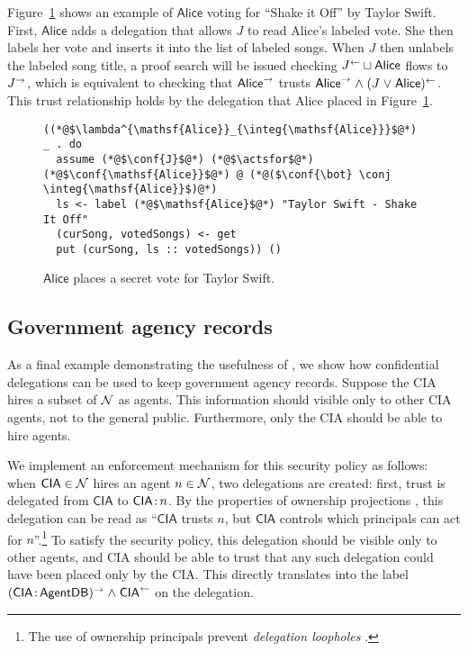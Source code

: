 Figure~\ref{fig:jukebox-alice-votes-for-taylor-swift} shows an example of $\mathsf{Alice}$ voting for ``Shake it Off'' by Taylor Swift. First, $\mathsf{Alice}$ adds a delegation that allows $J$ to read Alice's labeled vote. She then labels her vote and inserts it into the list of labeled songs. When $J$ then unlabels the labeled song title, a proof search will be issued checking $J^{\leftarrow} \sqcup \mathsf{Alice}$ flows to $J^{\rightarrow}$, which is equivalent to checking that $\mathsf{Alice}^{\rightarrow}$ trusts $\mathsf{Alice}^{\rightarrow} \mathrel{\land} (J \mathrel{\lor} \mathsf{Alice})^{\leftarrow}$. This trust relationship holds by the delegation that Alice placed in Figure~\ref{fig:jukebox-alice-votes-for-taylor-swift}.

\begin{figure}
\centering
\begin{lstlisting}
((*@$\lambda^{\mathsf{Alice}}_{\integ{\mathsf{Alice}}}$@*) _ . do
  assume (*@$\conf{J}$@*) (*@$\actsfor$@*) (*@$\conf{\mathsf{Alice}}$@*) @ (*@($\conf{\bot} \conj \integ{\mathsf{Alice}}$)@*)
  ls <- label (*@$\mathsf{Alice}$@*) "Taylor Swift - Shake It Off"
  (curSong, votedSongs) <- get
  put (curSong, ls :: votedSongs)) ()
\end{lstlisting}
\caption{$\mathsf{Alice}$ places a secret vote for Taylor Swift.}
\label{fig:jukebox-alice-votes-for-taylor-swift}
\end{figure}

\subsection{Government agency records}\label{subsec:agents}
As a final example demonstrating the usefulness of \lang, we show how confidential delegations can be used to keep government agency records. Suppose the CIA hires a subset of $\mathcal{N}$  as agents. 
This information should visible only to other CIA agents, not to the general public. Furthermore, only the CIA should be able to hire agents.

We implement an enforcement mechanism for this security policy as follows: when $\mathsf{CIA} \in \mathcal{N}$ hires an agent $n \in \mathcal{N}$, two delegations are created: first, trust is delegated from $\mathsf{CIA}$ to $\mathsf{CIA} \colon \!n$. By the properties of ownership projections \cite{Arden:2015:FA:2859845.2859998}, this delegation can be read as ``$\mathsf{CIA}$ trusts $n$, but $\mathsf{CIA}$ controls which principals can act for $n$''.\footnote{The use of ownership principals prevent \emph{delegation loopholes} \cite{Arden:2015:FA:2859845.2859998}.} To satisfy the security policy, this delegation should be visible only to other agents, and CIA should be able to trust that any such delegation could have been placed only by the CIA. This directly translates into the label $(\mathsf{CIA} \colon \!\mathsf{AgentDB})^{\rightarrow} \mathrel{\land} \mathsf{CIA}^{\leftarrow}$ on the delegation.

